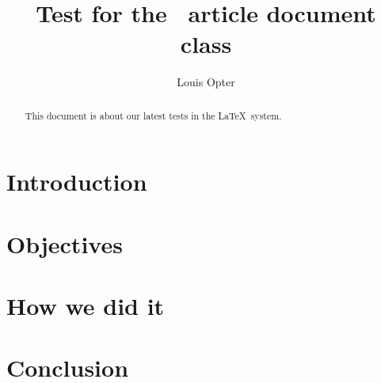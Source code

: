 \documentclass[american]{rtxarticle}
\author{Louis Opter}
\title{Test for the \rtx\ article document class}
\begin{document}
\maketitle

\begin{abstract}
This document is about our latest tests in the \LaTeX\ system.
\end{abstract}

\rtxmaketitleblock

\section{Introduction}

\lipsum[1]

\section{Objectives}

\lipsum[2]

\section{How we did it}

\lipsum[3]

\section{Conclusion}

\lipsum[4]
\end{document}
